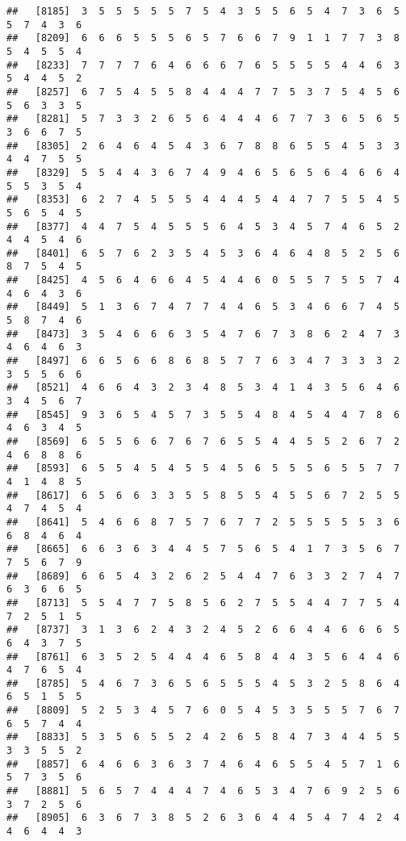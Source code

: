 \documentclass[
]{book}
\begin{document}
\begin{verbatim}
##   [8185]  3  5  5  5  5  5  7  5  4  3  5  5  6  5  4  7  3  6  5  5  7  4  3  6
##   [8209]  6  6  6  5  5  5  6  5  7  6  6  7  9  1  1  7  7  3  8  5  4  5  5  4
##   [8233]  7  7  7  7  6  4  6  6  6  7  6  5  5  5  5  4  4  6  3  5  4  4  5  2
##   [8257]  6  7  5  4  5  5  8  4  4  4  7  7  5  3  7  5  4  5  6  5  6  3  3  5
##   [8281]  5  7  3  3  2  6  5  6  4  4  4  6  7  7  3  6  5  6  5  3  6  6  7  5
##   [8305]  2  6  4  6  4  5  4  3  6  7  8  8  6  5  5  4  5  3  3  4  4  7  5  5
##   [8329]  5  5  4  4  3  6  7  4  9  4  6  5  6  5  6  4  6  6  4  5  5  3  5  4
##   [8353]  6  2  7  4  5  5  5  4  4  4  5  4  4  7  7  5  5  4  5  5  6  5  4  5
##   [8377]  4  4  7  5  4  5  5  5  6  4  5  3  4  5  7  4  6  5  2  4  4  5  4  6
##   [8401]  6  5  7  6  2  3  5  4  5  3  6  4  6  4  8  5  2  5  6  8  7  5  4  5
##   [8425]  4  5  6  4  6  6  4  5  4  4  6  0  5  5  7  5  5  7  4  4  6  4  3  6
##   [8449]  5  1  3  6  7  4  7  7  4  4  6  5  3  4  6  6  7  4  5  5  8  7  4  6
##   [8473]  3  5  4  6  6  6  3  5  4  7  6  7  3  8  6  2  4  7  3  4  6  4  6  3
##   [8497]  6  6  5  6  6  8  6  8  5  7  7  6  3  4  7  3  3  3  2  3  5  5  6  6
##   [8521]  4  6  6  4  3  2  3  4  8  5  3  4  1  4  3  5  6  4  6  3  4  5  6  7
##   [8545]  9  3  6  5  4  5  7  3  5  5  4  8  4  5  4  4  7  8  6  4  6  3  4  5
##   [8569]  6  5  5  6  6  7  6  7  6  5  5  4  4  5  5  2  6  7  2  4  6  8  8  6
##   [8593]  6  5  5  4  5  4  5  5  4  5  6  5  5  5  6  5  5  7  7  4  1  4  8  5
##   [8617]  6  5  6  6  3  3  5  5  8  5  5  4  5  5  6  7  2  5  5  4  7  4  5  4
##   [8641]  5  4  6  6  8  7  5  7  6  7  7  2  5  5  5  5  5  3  6  6  8  4  6  4
##   [8665]  6  6  3  6  3  4  4  5  7  5  6  5  4  1  7  3  5  6  7  7  5  6  7  9
##   [8689]  6  6  5  4  3  2  6  2  5  4  4  7  6  3  3  2  7  4  7  6  3  6  6  5
##   [8713]  5  5  4  7  7  5  8  5  6  2  7  5  5  4  4  7  7  5  4  7  2  5  1  5
##   [8737]  3  1  3  6  2  4  3  2  4  5  2  6  6  4  4  6  6  6  5  6  4  3  7  5
##   [8761]  6  3  5  2  5  4  4  4  6  5  8  4  4  3  5  6  4  4  6  4  7  6  5  4
##   [8785]  5  4  6  7  3  6  5  6  5  5  5  4  5  3  2  5  8  6  4  6  5  1  5  5
##   [8809]  5  2  5  3  4  5  7  6  0  5  4  5  3  5  5  5  7  6  7  6  5  7  4  4
##   [8833]  5  3  5  6  5  5  2  4  2  6  5  8  4  7  3  4  4  5  5  3  3  5  5  2
##   [8857]  6  4  6  6  3  6  3  7  4  6  4  6  5  5  4  5  7  1  6  5  7  3  5  6
##   [8881]  5  6  5  7  4  4  4  7  4  6  5  3  4  7  6  9  2  5  6  3  7  2  5  6
##   [8905]  6  3  6  7  3  8  5  2  6  3  6  4  4  5  4  7  4  2  4  4  6  4  4  3

\end{verbatim}
\end{document}
